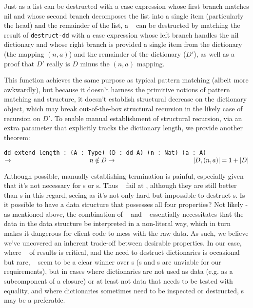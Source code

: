 {Just as a list can be destructed with a case expression whose first branch matches nil and whose second branch
decomposes the list into a single item (particularly the head) and the remainder of the list, a \dd~ can be
destructed by matching the result of \texttt{destruct-dd} with a case expression whose left branch handles the
nil dictionary and whose right branch is provided a single item from the dictionary (the mapping $(n, a)$)
and the remainder of the dictionary ($D'$), as well as a proof that $D'$ really is $D$ minus the $(n, a)$
mapping.

This function achieves the same purpose as typical pattern matching (albeit more awkwardly), but because it
doesn't harness the primitive notions of pattern matching and structure, it doesn't establish structural
decrease on the dictionary object, which may break out-of-the-box structural recursion in the likely case
of recursion on $D'$. To enable manual establishment of structural recursion, via an extra parameter that
explicitly tracks the dictionary length, we provide another theorem:

\texttt{dd-extend-length : (A : Type) (D : dd A) (n : Nat) (a : A) $\rightarrow \\
\phantom{xxxxxxxxxxxxxxxxxxxxx} n \notin D \rightarrow \\
\phantom{xxxxxxxxxxxxxxxxxxxxx} |D, (n, a)| = 1 + |D|$}

Although possible, manually establishing termination is painful, especially given that it's not necessary
for {\SAL}s or {\CAL}s. Thus \dds~ fail at \EzDstr, although they are still better than {\FPF}s in this
regard, seeing as it's not only hard but impossible to destruct {\FPF}s. Is it possible to have a data
structure that possesses all four properties? Not likely - as mentioned above, the combination of
\SemInj~ and \SemTot~ essentially
necessitates that the data in the data structure be interpreted in a non-literal way, which in turn
makes it dangerous for client code to mess with the raw data. As such, we believe we've uncovered an
inherent trade-off between desirable properties. In our case, where \EqDec~ of results is critical,
and the need to destruct dictionaries is occasional but rare, \dds~ seem to be a clear winner over
{\CAL}s ({\SAL}s and {\FPF}s are unviable for our requirements), but in cases where dictionaries are
not used as data
(e.g. as a subcomponent of a closure) or at least not data that needs to be tested with equality, and
where dictionaries sometimes need to be inspected or destructed, {\CAL}s may be a preferable.

} %
